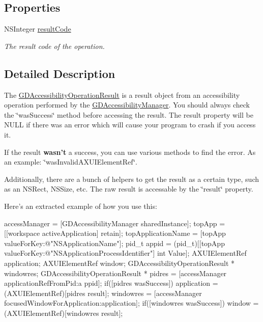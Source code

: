 \subsection*{Properties}
\begin{DoxyCompactItemize}
\item 
\hypertarget{interface_g_d_accessibility_operation_result_a3a0f4227d16730e41aa02034f00626c9}{
NSInteger \hyperlink{interface_g_d_accessibility_operation_result_a3a0f4227d16730e41aa02034f00626c9}{resultCode}}
\label{interface_g_d_accessibility_operation_result_a3a0f4227d16730e41aa02034f00626c9}

\begin{DoxyCompactList}\small\item\em The result code of the operation. \item\end{DoxyCompactList}\end{DoxyCompactItemize}


\subsection{Detailed Description}
The \hyperlink{interface_g_d_accessibility_operation_result}{GDAccessibilityOperationResult} is a result object from an accessibility operation performed by the \hyperlink{interface_g_d_accessibility_manager}{GDAccessibilityManager}. You should always check the \char`\"{}wasSuccess\char`\"{} method before accessing the result. The result property will be NULL if there was an error which will cause your program to crash if you access it.

If the result {\bfseries wasn't} a success, you can use various methods to find the error. As an example: \char`\"{}wasInvalidAXUIElementRef\char`\"{}.

Additionally, there are a bunch of helpers to get the result as a certain type, such as an NSRect, NSSize, etc. The raw result is accessable by the \char`\"{}result\char`\"{} property.

Here's an extracted example of how you use this:


\begin{DoxyCode}
 accessManager = [GDAccessibilityManager sharedInstance];
 topApp = [[workspace activeApplication] retain];
 topApplicationName = [topApp valueForKey:@"NSApplicationName"];
 pid_t appid = (pid_t)[[topApp valueForKey:@"NSApplicationProcessIdentifier"] int
      Value];
 AXUIElementRef application;
 AXUIElementRef window;
 GDAccessibilityOperationResult * windowres;
 GDAccessibilityOperationResult * pidres = [accessManager applicationRefFromPid:a
      ppid];
 if([pidres wasSuccess]) {
          application = (AXUIElementRef)[pidres result];
          windowres = [accessManager focusedWindowForApplication:application];
          if([windowres wasSuccess]) {
                 window = (AXUIElementRef)[windowres result];
          }
 }
\end{DoxyCode}
 

